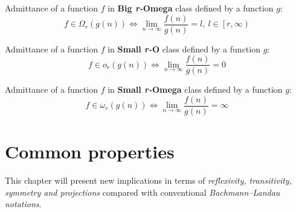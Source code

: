 \begin{theorem}
    Admittance of a function $f$ in \textbf{Big \textit{r-}Omega} class defined by a function $g$:
    \[ f \in \Omega_{r}(g(n)) \Leftrightarrow \lim_{n\to\infty} \dfrac{f(n)}{g(n)} = l,\ l \in \left[ r, \infty \right) \]
\end{theorem}

\begin{theorem}
    Admittance of a function $f$ in \textbf{Small \textit{r-}O} class defined by a function $g$:
    \[ f \in o_{r}(g(n)) \Leftrightarrow \lim_{n\to\infty} \dfrac{f(n)}{g(n)} = 0 \]
\end{theorem}

\begin{theorem}
    Admittance of a function $f$ in \textbf{Small \textit{r-}Omega} class defined by a function $g$:
    \[ f \in \omega_{r}(g(n)) \Leftrightarrow \lim_{n\to\infty} \dfrac{f(n)}{g(n)} = \infty \]
\end{theorem}


\section{Common properties}
This chapter will present new implications in terms of \textit{reflexivity, transitivity, symmetry and projections} compared with conventional \textit{Bachmann–Landau notations}.

